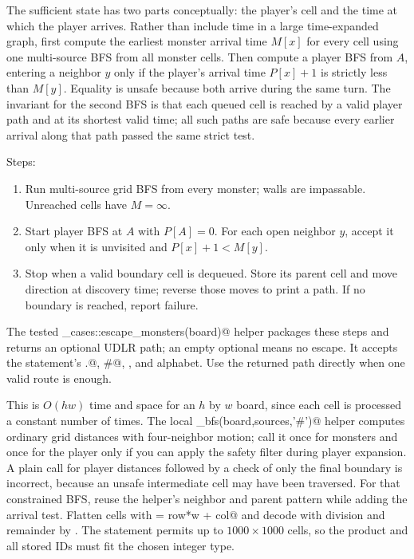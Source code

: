 The sufficient state has two parts conceptually: the player's cell and the
time at which the player arrives. Rather than include time in a large
time-expanded graph, first compute the earliest monster arrival time
$M[x]$ for every cell using one multi-source BFS from all monster cells.
Then compute a player BFS from $A$, entering a neighbor $y$ only if the
player's arrival time $P[x]+1$ is strictly less than $M[y]$. Equality is
unsafe because both arrive during the same turn. The invariant for the
second BFS is that each queued cell is reached by a valid player path and at
its shortest valid time; all such paths are safe because every earlier
arrival along that path passed the same strict test.

Steps:
\begin{enumerate}
\item Run multi-source grid BFS from every monster; walls are impassable.
Unreached cells have $M=\infty$.
\item Start player BFS at $A$ with $P[A]=0$. For each open neighbor $y$,
accept it only when it is unvisited and $P[x]+1<M[y]$.
\item Stop when a valid boundary cell is dequeued. Store its parent cell
and move direction at discovery time; reverse those moves to print a path.
If no boundary is reached, report failure.
\end{enumerate}
\columnbreak
{}
The tested \verb@finals_cases::escape_monsters(board)@ helper packages these
steps and returns an optional UDLR path; an empty optional means no escape.
It accepts the statement's \verb@.@, \verb@#@, \verb@A@, and \verb@M@
alphabet. Use the returned path directly when one valid route is enough.

This is $O(hw)$ time and space for an $h$ by $w$ board, since each cell is
processed a constant number of times. The local \verb@grid_bfs(board,sources,'#')@
helper computes ordinary grid distances with four-neighbor motion; call it
once for monsters and once for the player only if you can apply the safety
filter during player expansion. A plain call for player distances followed
by a check of only the final boundary is incorrect, because an unsafe
intermediate cell may have been traversed. For that constrained BFS, reuse
the helper's neighbor and parent pattern while adding the arrival test.
Flatten cells with \verb@id = row*w + col@ and decode with division and
remainder by \verb@w@. The statement permits up to $1000\times1000$ cells,
so the product and all stored IDs must fit the chosen integer type.


